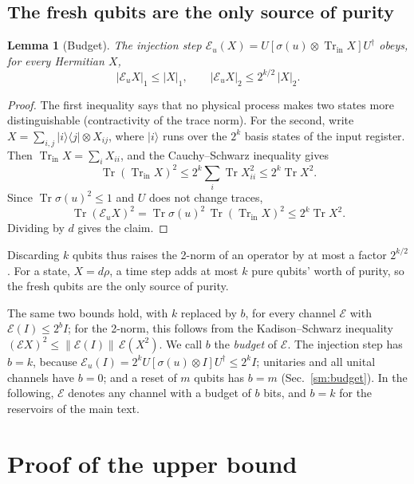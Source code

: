 \documentclass[aps,prl,twocolumn,superscriptaddress,floatfix]{revtex4-2}
\theoremstyle{plain}
\newtheorem{lemma}{Lemma}
\newcommand{\tr}{\operatorname{Tr}}
\newcommand{\ket}[1]{|#1\rangle}
\newcommand{\ketbra}[2]{|#1\rangle\!\langle #2|}
\newcommand{\nrm}[2]{\lvert #1\rvert_{#2}}
\newcommand{\Norm}[1]{\lVert #1\rVert}
\newcommand{\cE}{\mathcal E}
\begin{document}
\subsection{The fresh qubits are the only source of purity}

\begin{lemma}[Budget]\label{lem:norms}
The injection step $\cE_u(X)=U[\sigma(u)\otimes\tr_{\mathrm{in}}X]U^\dagger$ obeys, for every Hermitian $X$,
\begin{equation}
\nrm{\cE_uX}1\le\nrm X1,\qquad\nrm{\cE_uX}2\le2^{k/2}\,\nrm X2 .
\label{eq:S-norms}
\end{equation}
\end{lemma}

\begin{proof}
The first inequality says that no physical process makes two states more distinguishable (contractivity of the trace norm). For the second, write $X=\sum_{i,j}\ketbra ij\otimes X_{ij}$, where $\ket i$ runs over the $2^k$ basis states of the input register. Then $\tr_{\mathrm{in}}X=\sum_iX_{ii}$, and the Cauchy--Schwarz inequality gives
\[
\tr(\tr_{\mathrm{in}}X)^2\le2^k\sum_i\tr X_{ii}^2\le2^k\tr X^2 .
\]
Since $\tr\sigma(u)^2\le1$ and $U$ does not change traces,
\[
\tr(\cE_uX)^2=\tr\sigma(u)^2\,\tr(\tr_{\mathrm{in}}X)^2\le2^k\tr X^2 .
\]
Dividing by $d$ gives the claim.
\end{proof}

Discarding $k$ qubits thus raises the 2-norm of an operator by at most a factor $2^{k/2}$. For a state, $X=d\rho$, a time step adds at most $k$ pure qubits' worth of purity, so the fresh qubits are the only source of purity.

The same two bounds hold, with $k$ replaced by $b$, for every channel $\cE$ with $\cE(I)\le2^bI$; for the 2-norm, this follows from the Kadison--Schwarz inequality $(\cE X)^2\le\Norm{\cE(I)}\,\cE(X^2)$. We call $b$ the \emph{budget} of $\cE$. The injection step has $b=k$, because $\cE_u(I)=2^kU[\sigma(u)\otimes I]U^\dagger\le2^kI$; unitaries and all unital channels have $b=0$; and a reset of $m$ qubits has $b=m$ (Sec.~\ref{sm:budget}). In the following, $\cE$ denotes any channel with a budget of $b$ bits, and $b=k$ for the reservoirs of the main text.

\section{Proof of the upper bound}
\label{sm:upper}
\end{document}
